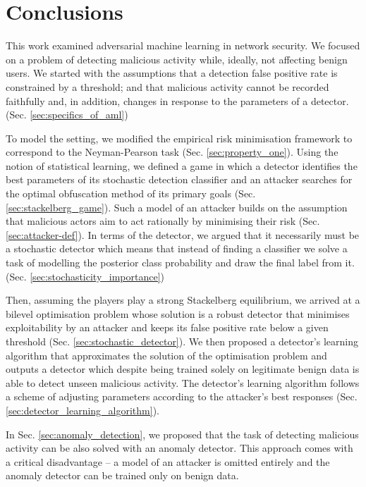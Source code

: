 \section*{Conclusions}
This work examined adversarial machine learning in network security. We focused on a problem of detecting malicious activity while, ideally, not affecting benign users. We started with the assumptions that a detection false positive rate is constrained by a threshold; and that malicious activity cannot be recorded faithfully and, in addition, changes in response to the parameters of a detector. (Sec. \ref{sec:specifics_of_aml})

To model the setting, we modified the empirical risk minimisation framework to correspond to the Neyman-Pearson task (Sec. \ref{sec:property_one}). Using the notion of statistical learning, we defined a game in which a detector identifies the best parameters of its stochastic detection classifier and an attacker searches for the optimal obfuscation method of its primary goals (Sec. \ref{sec:stackelberg_game}). Such a model of an attacker builds on the assumption that malicious actors aim to act rationally by minimising their risk (Sec. \ref{sec:attacker-def}).
In terms of the detector, we argued that it necessarily must be a stochastic detector which means that instead of finding a classifier we solve a task of modelling the posterior class probability and draw the final label from it. (Sec. \ref{sec:stochasticity_importance})

Then, assuming the players play a strong Stackelberg equilibrium, we arrived at a bilevel optimisation problem whose solution is a robust detector that minimises exploitability by an attacker and keeps its false positive rate below a given threshold (Sec. \ref{sec:stochastic_detector}). We then proposed a detector's learning algorithm that approximates the solution of the optimisation problem and outputs a detector which despite being trained solely on legitimate benign data is able to detect unseen malicious activity. The detector's learning algorithm follows a scheme of adjusting parameters according to the attacker's best responses (Sec. \ref{sec:detector_learning_algorithm}).

In Sec. \ref{sec:anomaly_detection}, we proposed that the task of detecting malicious activity can be also solved with an anomaly detector. This approach comes with a critical disadvantage – a model of an attacker is omitted entirely and the anomaly detector can be trained only on benign data.

